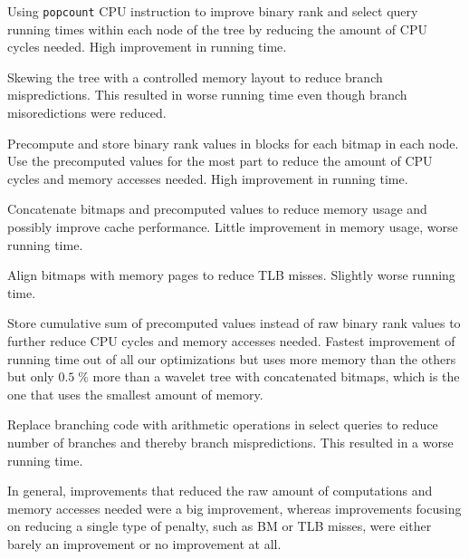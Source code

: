 \begin{description*}
\item[Using \texttt{popcount} CPU instruction] to improve binary rank and select query running times within each node of the tree by reducing the amount of CPU cycles needed. High improvement in running time. 
\item[Skewing the tree] with a controlled memory layout to reduce branch mispredictions. This resulted in worse running time even though branch misoredictions were reduced.
\item[Precompute and store binary rank values] in blocks for each bitmap in each node. Use the precomputed values for the most part to reduce the amount of CPU cycles and memory accesses needed. High improvement in running time.
\item[Concatenate bitmaps and precomputed values] to reduce memory usage and possibly improve cache performance. Little improvement in memory usage, worse running time.
\item[Align bitmaps with memory pages] to reduce TLB misses. Slightly worse running time.
\item[Store cumulative sum of precomputed values] instead of raw binary rank values to further reduce CPU cycles and memory accesses needed. Fastest improvement of running time out of all our optimizations but uses more memory than the others but only $0.5\;\%$ more than a wavelet tree with concatenated bitmaps, which is the one that uses the smallest amount of memory.
\item[Replace branching code with arithmetic operations] in select queries to reduce number of branches and thereby branch mispredictions. This resulted in a worse running time.
\end{description*}

In general, improvements that reduced the raw amount of computations and memory accesses needed were a big improvement, whereas improvements focusing on reducing a single type of penalty, such as BM or TLB misses, were either barely an improvement or no improvement at all.